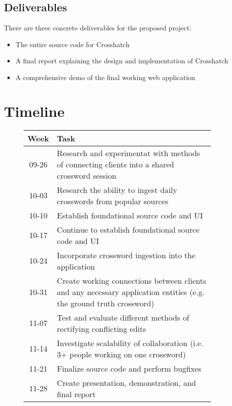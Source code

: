 \documentclass{article}
\begin{document}
\subsection{Deliverables}
There are three concrete deliverables for the proposed project:
\begin{itemize}
  \item The entire source code for Crosshatch
  \item A final report explaining the design and implementation of Crosshatch
  \item A comprehensive demo of the final working web application
\end{itemize}

\newpage
\section{Timeline}
\label{timeline}
\begin{figure}[h]
  \centering
  \begin{tabular}{| c | p{0.9\linewidth} |}
    \hline
    \textbf{Week} & \textbf{Task} \\ \hline
    09-26 & Research and experimentat with methods of connecting
            clients into a shared crossword session \\ \hline
    10-03 & Research the ability to
            ingest daily crosswords from popular sources \\ \hline
    10-10 & Establish foundational source code and UI \\ \hline
    10-17 & Continue to establish foundational source code and UI \\ \hline
    10-24 & Incorporate crossword ingestion into the application \\ \hline
    10-31 & Create working connections between clients and any
            necessary application entities (e.g. the ground truth crossword) \\ \hline
    11-07 & Test and evaluate different methods of rectifying conflicting edits  \\ \hline
    11-14 & Investigate scalability of collaboration (i.e. 3+ people working on one crossword) \\ \hline
    11-21 & Finalize source code and perform bugfixes \\ \hline
    11-28 & Create presentation, demonstration, and final report \\ \hline

    \end{tabular}
\end{figure}
\end{document}

